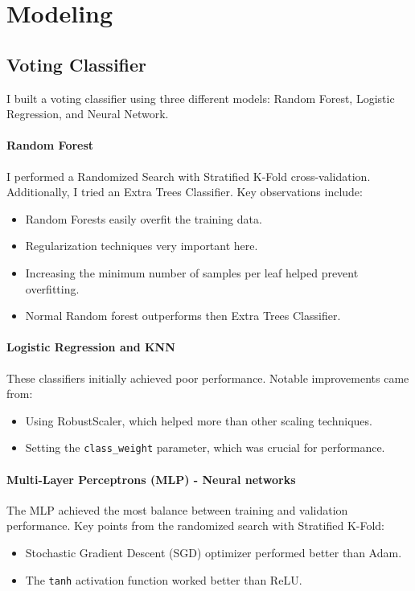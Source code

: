 \section{Modeling}
\subsection{Voting Classifier}

I built a voting classifier using three different models: Random Forest, Logistic Regression, and Neural Network.

\paragraph{Random Forest}
I performed a Randomized Search with Stratified K-Fold cross-validation. Additionally, I tried an Extra Trees Classifier. Key observations include:
\begin{itemize}
    \item Random Forests easily overfit the training data.
    \item Regularization techniques very important here.
    \item Increasing the minimum number of samples per leaf helped prevent overfitting.
    \item Normal Random forest outperforms then Extra Trees Classifier.
\end{itemize}

\paragraph{Logistic Regression and KNN}
These classifiers initially achieved poor performance. Notable improvements came from:
\begin{itemize}
    \item Using RobustScaler, which helped more than other scaling techniques.
    \item Setting the \texttt{class\_weight} parameter, which was crucial for performance.
\end{itemize}

\paragraph{Multi-Layer Perceptrons (MLP) - Neural networks}
The MLP achieved the most balance between training and validation performance. Key points from the randomized search with Stratified K-Fold:
\begin{itemize}
    \item Stochastic Gradient Descent (SGD) optimizer performed better than Adam.
    \item The \texttt{tanh} activation function worked better than ReLU.
\end{itemize}


